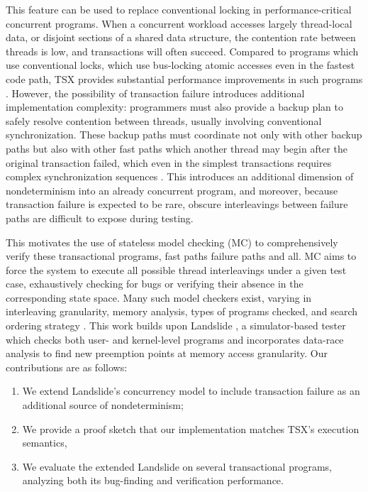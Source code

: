 \documentclass[10pt]{sigplanconf}
\begin{document}
This feature can be used to replace conventional locking in performance-critical concurrent programs.
When a concurrent workload accesses largely thread-local data,
or disjoint sections of a shared data structure,
the contention rate between threads is low,
and transactions will often succeed.
Compared to programs which use conventional locks,
which use bus-locking atomic accesses even in the fastest code path,
TSX provides substantial performance improvements in such programs \cite{htm-experience, htm-performance, htm-mario}.
However, the possibility of transaction failure introduces additional implementation complexity:
programmers must also provide a backup plan
to safely resolve contention between threads,
usually involving conventional synchronization.
These backup paths must coordinate not only with other backup paths
but also with other fast paths which another thread may begin after the original transaction failed,
which even in the simplest transactions requires complex synchronization sequences
\cite{htm-mario}.
This introduces an additional dimension of nondeterminism into an already concurrent program,
and moreover, because transaction failure is expected to be rare,
obscure interleavings between failure paths are difficult to expose during testing.

This motivates the use of stateless model checking (MC) \cite{verisoft}
to comprehensively verify these transactional programs,
fast paths failure paths and all.
MC aims to force the system to execute all possible thread interleavings under a given test case,
exhaustively checking for bugs or verifying their absence in the corresponding state space.
Many such model checkers exist, varying in
interleaving granularity, memory analysis, types of programs checked, and search ordering strategy
\cite{chess,dbug-ssv,spin,inspect,r4,portend,samc,mcr,randomized-scheduler}.
This work builds upon Landslide \cite{landslide,quicksand,landslide-phdthesis},
a simulator-based tester which checks both user- and kernel-level programs
and incorporates data-race analysis \cite{tsan,fasttrack} to find new preemption points
at memory access granularity.
Our contributions are as follows:

\begin{enumerate}
	\item We extend Landslide's concurrency model to include transaction failure as an additional source of nondeterminism;
	\item We provide a proof sketch that our implementation matches TSX's execution semantics,
	\item We evaluate the extended Landslide on several transactional programs, analyzing both its bug-finding and verification performance.
\end{enumerate}
\end{document}
